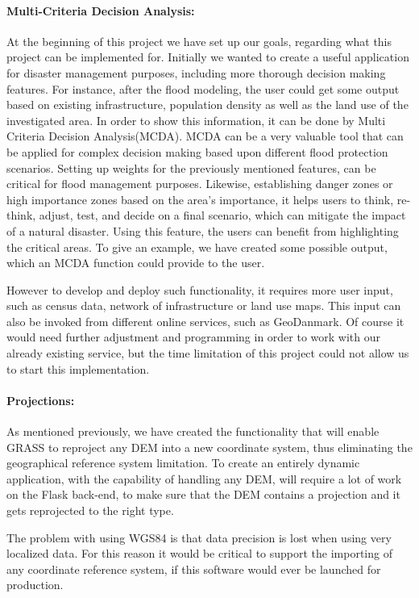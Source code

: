 \paragraph{Multi-Criteria Decision Analysis:} At the beginning of this project we have set up our goals, regarding what this project can be implemented for. Initially we wanted to create a useful application for disaster management purposes, including more thorough decision making features. For instance, after the flood modeling, the user could get some output based on existing infrastructure, population density as well as the land use of the investigated area. In order to show this information, it can be done by Multi Criteria Decision Analysis(MCDA).
MCDA can be a very valuable tool that can be applied for complex decision making based upon different flood protection scenarios. Setting up weights for the previously mentioned features, can be critical for flood management purposes. Likewise, establishing danger zones or high importance zones based on the area's importance, it helps users to think, re-think, adjust, test, and decide on a final scenario, which can mitigate the impact of a natural disaster. Using this feature, the users can benefit from  highlighting the critical areas. To give an example, we have created some possible output, which an MCDA function could provide to the user.

However to develop and deploy such functionality, it requires more user input, such as census data, network of infrastructure or land use maps. This input can also be invoked from different online services, such as  GeoDanmark. Of course it would need further adjustment and programming in order to work with our already existing service, but the time limitation of this project could not allow us to start this implementation.

\paragraph{Projections:} As mentioned previously, we have created the functionality that will enable GRASS to reproject any DEM into a new coordinate system, thus eliminating the geographical reference system limitation. To create an entirely dynamic application, with the capability of handling any DEM, will require a lot of work on the Flask back-end, to make sure that the DEM contains a projection and it gets reprojected to the right type.

The problem with using WGS84 is that data precision is lost when using very localized data. For this reason it would be critical to support the importing of any coordinate reference system, if this software would ever be launched for production.

